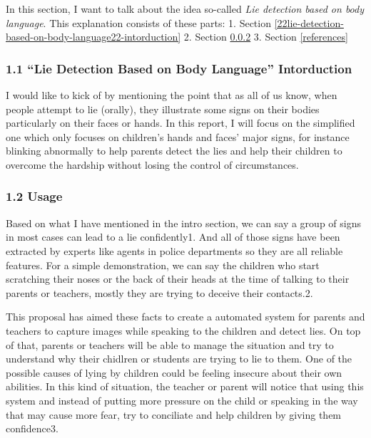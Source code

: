 \documentclass[11pt]{article}
\begin{document}
In this section, I want to talk about the idea so-called \emph{Lie
detection based on body language}. This explanation consists of these
parts: 1.
Section \ref{22lie-detection-based-on-body-language22-intorduction} 2.
Section \ref{usage} 3. Section \ref{references}

\hypertarget{lie-detection-based-on-body-language-intorduction}{%
\subsubsection{1.1 ``Lie Detection Based on Body Language''
Intorduction}\label{lie-detection-based-on-body-language-intorduction}}

I would like to kick of by mentioning the point that as all of us know,
when people attempt to lie (orally), they illustrate some signs on their
bodies particularly on their faces or hands. In this report, I will
focus on the simplified one which only focuses on children's hands and
faces' major signs, for instance blinking abnormally to help parents
detect the lies and help their children to overcome the hardship without
losing the control of circumstances.

\hypertarget{usage}{%
\subsubsection{1.2 Usage}\label{usage}}

Based on what I have mentioned in the intro section, we can say a group
of signs in most cases can lead to a lie confidently1. And all of those
signs have been extracted by experts like agents in police departments
so they are all reliable features. For a simple demonstration, we can
say the children who start scratching their noses or the back of their
heads at the time of talking to their parents or teachers, mostly they
are trying to deceive their contacts.2.

This proposal has aimed these facts to create a automated system for
parents and teachers to capture images while speaking to the children
and detect lies. On top of that, parents or teachers will be able to
manage the situation and try to understand why their chidlren or
students are trying to lie to them. One of the possible causes of lying
by children could be feeling insecure about their own abilities. In this
kind of situation, the teacher or parent will notice that using this
system and instead of putting more pressure on the child or speaking in
the way that may cause more fear, try to conciliate and help children by
giving them confidence3.
\end{document}
